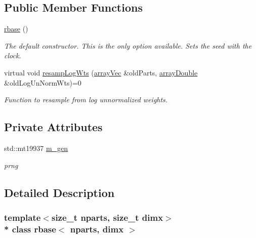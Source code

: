 \subsection*{Public Member Functions}
\begin{DoxyCompactItemize}
\item 
\hyperlink{classrbase_ac50680d1f898da868a3a0cbc439522ea}{rbase} ()\hypertarget{classrbase_ac50680d1f898da868a3a0cbc439522ea}{}\label{classrbase_ac50680d1f898da868a3a0cbc439522ea}

\begin{DoxyCompactList}\small\item\em The default constructor. This is the only option available. Sets the seed with the clock. \end{DoxyCompactList}\item 
virtual void \hyperlink{classrbase_ad14a177d1beb6fae9ee8370c29f46da9}{resamp\+Log\+Wts} (\hyperlink{classrbase_a428b9f0dd8712a93c096baaf6ab74d8c}{array\+Vec} \&old\+Parts, \hyperlink{classrbase_ab1b61e00a2e0783d9b414118d912427e}{array\+Double} \&old\+Log\+Un\+Norm\+Wts)=0
\begin{DoxyCompactList}\small\item\em Function to resample from log unnormalized weights. \end{DoxyCompactList}\end{DoxyCompactItemize}
\subsection*{Private Attributes}
\begin{DoxyCompactItemize}
\item 
std\+::mt19937 \hyperlink{classrbase_a4083e9e008ffe12b62d53d71a8a78644}{m\+\_\+gen}\hypertarget{classrbase_a4083e9e008ffe12b62d53d71a8a78644}{}\label{classrbase_a4083e9e008ffe12b62d53d71a8a78644}

\begin{DoxyCompactList}\small\item\em prng \end{DoxyCompactList}\end{DoxyCompactItemize}


\subsection{Detailed Description}
\subsubsection*{template$<$size\+\_\+t nparts, size\+\_\+t dimx$>$\\*
class rbase$<$ nparts, dimx $>$}

